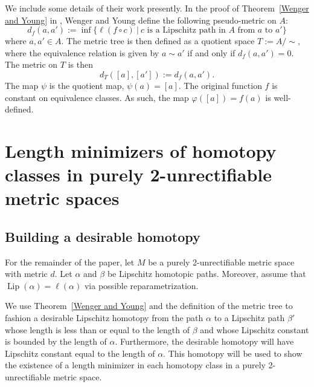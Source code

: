 \documentclass{article}
\theoremstyle{definition}
\theoremstyle{remark}
\def\deq{:=}
\newcommand{\length}[1]{\ell}%
\newcommand{\core}[1]{{#1}_\infty}
\DeclareMathOperator{\Lip}{Lip}
\begin{document}
 We include some details of their work presently. In the proof of Theorem~\ref{Wenger and Young} in \cite{Weg}, Wenger and Young define the following pseudo-metric on $A$: 
\[
d_f(a,a')\deq\inf\{\length{M}(f\circ c)~|~c\text{ is a Lipschitz path in }A\text{ from }a\text{ to }a'\}
\]
where $a,a'\in A$. The metric tree is then defined as a quotient space $T\deq A/\sim$, where the equivalence relation is given by $a\sim a'$ if and only if $d_f(a,a')=0$. The metric on $T$ is then
\[
d_T([a],[a'])\deq d_f(a,a').
\]
The map $\psi$ is the quotient map, $\psi(a)=[a]$. The original function $f$ is constant on equivalence classes. As such, the map $\varphi([a])=f(a)$ is well-defined.


\section{Length minimizers of homotopy classes in purely 2-unrectifiable metric spaces}



%

\subsection{Building a desirable homotopy}

For the remainder of the paper, let $M$ be a purely 2-unrectifiable metric space with metric $d$. Let $\alpha$ and $\beta$ be Lipschitz homotopic paths. Moreover, assume that $\Lip(\alpha)=\length{M}(\alpha)$ via possible  reparametrization.

We use Theorem~\ref{Wenger and Young} and the definition of the metric tree to fashion a desirable Lipschitz homotopy from the path $\alpha$ to a Lipschitz path $\beta'$ whose length is less than or equal to the length of $\beta$ and whose Lipschitz constant is bounded by the length of $\alpha$. Furthermore, the desirable homotopy will have Lipschitz constant equal to the length of $\alpha$. This homotopy will be used to show the existence of a length minimizer in each homotopy class in a purely 2-unrectifiable metric space.
\end{document}
